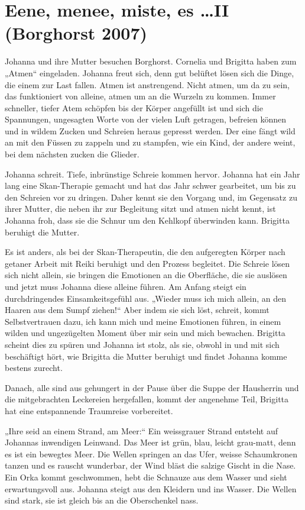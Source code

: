 \documentclass[10pt,titlepage,a5paper]{book}
\begin{document}
\section*{Eene, menee, miste, es \dots  II (Borghorst 2007)}




Johanna und ihre Mutter besuchen Borghorst. Cornelia und Brigitta haben zum „Atmen“ eingeladen. Johanna freut sich, denn gut belüftet lösen sich die Dinge, die einem zur Last fallen. Atmen ist anstrengend. Nicht atmen, um da zu sein, das funktioniert von alleine, atmen um an die Wurzeln zu kommen. Immer schneller, tiefer Atem schöpfen bis der Körper angefüllt ist und sich die Spannungen, ungesagten Worte von der vielen Luft getragen, befreien können und in wildem Zucken und Schreien heraus gepresst werden. Der eine fängt wild an mit den Füssen zu zappeln und zu stampfen, wie ein Kind, der andere weint, bei dem nächsten zucken die Glieder. 

Johanna schreit. Tiefe, inbrünstige Schreie kommen hervor. Johanna hat ein Jahr lang eine Skan-Therapie gemacht und hat das Jahr schwer gearbeitet, um bis zu den Schreien vor zu dringen. Daher kennt sie den Vorgang und, im Gegensatz zu ihrer Mutter, die neben ihr zur Begleitung sitzt und atmen nicht kennt, ist Johanna froh, dass sie die Schnur um den Kehlkopf überwinden kann. Brigitta beruhigt die Mutter. 

Es ist anders, als bei der Skan-Therapeutin, die den aufgeregten Körper nach getaner Arbeit mit Reiki  beruhigt und den Prozess begleitet. Die Schreie lösen sich nicht allein, sie bringen die Emotionen an die Oberfläche, die sie auslösen und jetzt muss Johanna diese alleine führen. Am Anfang steigt ein durchdringendes Einsamkeitsgefühl aus. „Wieder muss ich mich allein, an den Haaren aus dem Sumpf ziehen!“ Aber indem sie sich löst, schreit, kommt Selbstvertrauen dazu, ich kann mich und meine Emotionen führen, in einem wilden und ungezügelten Moment über mir sein und mich bewachen. Brigitta scheint dies zu spüren und Johanna ist stolz, als sie, obwohl in und mit sich beschäftigt hört, wie Brigitta die Mutter beruhigt und findet Johanna komme bestens zurecht.

Danach, alle sind aus gehungert in der Pause über die Suppe der Hausherrin und die mitgebrachten Leckereien hergefallen, kommt der angenehme Teil, Brigitta hat eine entspannende Traumreise vorbereitet. 

„Ihre seid an einem Strand, am Meer:“ Ein weissgrauer Strand entsteht auf Johannas inwendigen Leinwand. Das Meer ist grün, blau, leicht grau-matt, denn es ist ein bewegtes Meer. Die Wellen springen an das Ufer, weisse Schaumkronen tanzen und es rauscht wunderbar, der Wind bläst die salzige Gischt in die Nase. Ein Orka kommt geschwommen, hebt die Schnauze aus dem Wasser und  sieht erwartungsvoll aus. Johanna steigt aus den Kleidern und ins Wasser. Die Wellen sind stark, sie ist gleich bis an die Oberschenkel nass. 
\end{document}
